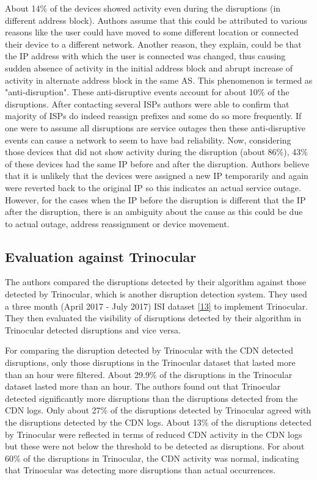 \documentclass[11pt,twoside,a4paper]{article}
\begin{document}
About 14\% of the devices showed activity even during the disruptions (in different address block). Authors assume that this could be attributed to various reasons like the user could have moved to some different location or connected their device to a different network. Another reason, they explain, could be that the IP address with which the user is connected was changed, thus causing sudden absence of activity in the initial address block and abrupt increase of activity in alternate address block in the same AS. This phenomenon is termed as "anti-disruption". These anti-disruptive events account for about 10\% of the disruptions. After contacting several ISPs authors were able to confirm that majority of ISPs do indeed reassign prefixes and some do so more frequently. If one were to assume all disruptions are service outages then these anti-disruptive events can cause a network to seem to have bad reliability.   
Now, considering those devices that did not show activity during the disruption (about 86\%), 43\% of these devices had the same IP before and after the disruption. Authors believe that it is unlikely that the devices were assigned a new IP temporarily and again were reverted back to the original IP so this indicates an actual service outage. However, for the cases when the IP before the disruption is different that the IP after the disruption, there is an ambiguity about the cause as this could be due to actual outage, address reassignment or device movement.

\subsection{Evaluation against Trinocular} 
The authors compared the disruptions detected by their algorithm against those detected by Trinocular, which is another disruption detection system. They used a three month (April 2017 - July 2017) ISI dataset \hyperlink {K9}{[13]} to implement Trinocular. They then evaluated the visibility of disruptions detected by their algorithm in Trinocular detected disruptions and vice versa. 

For comparing the disruption detected by Trinocular with the CDN detected disruptions, only those disruptions in the Trinocular dataset that lasted more than an hour were filtered. About 29.9\% of the disruptions in the Trinocular dataset lasted more than an hour. The authors found out that Trinocular detected significantly more disruptions than the disruptions detected from the CDN logs. Only about 27\% of the disruptions detected by Trinocular agreed with the disruptions detected by the CDN logs. About 13\% of the disruptions detected by Trinocular were reflected in terms of reduced CDN activity in the CDN logs but these were not below the threshold to be detected as disruptions. For about 60\% of the disruptions in Trinocular, the CDN activity was normal, indicating that Trinocular was detecting more disruptions than actual occurrences.
\end{document}
